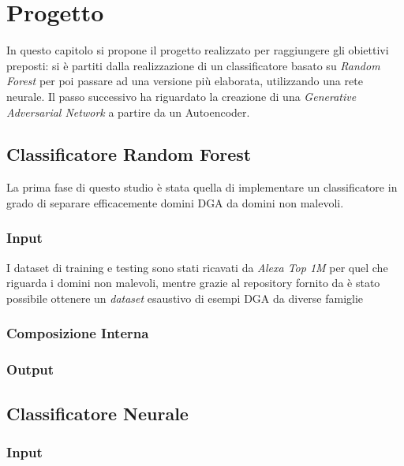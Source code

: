 \chapter{Progetto}
\label{progetto}

In questo capitolo si propone il progetto realizzato per raggiungere gli obiettivi preposti: si è partiti dalla realizzazione di un classificatore basato su \textit{Random Forest} per poi passare ad una versione più elaborata, utilizzando una rete neurale. Il passo successivo ha riguardato la creazione di una \textit{Generative Adversarial Network} a partire da un Autoencoder.  


\section{Classificatore Random Forest}
\label{randomforest}
La prima fase di questo studio è stata quella di implementare un classificatore in grado di separare efficacemente domini DGA da domini non malevoli. 

\subsection{Input}
\label{randomforestinput}
I dataset di training e testing sono stati ricavati da \textit{Alexa Top 1M} per quel che riguarda i domini non malevoli, mentre grazie al repository fornito da \cite{github:dgarepo} è stato possibile ottenere un \textit{dataset} esaustivo di esempi DGA da diverse famiglie

\subsection{Composizione Interna}
\label{randomforestinterno}

\subsection{Output}
\label{randomforestoutput}

\section{Classificatore Neurale}
\label{classificatorenn}

\subsection{Input}
\label{classificatorenninput}

